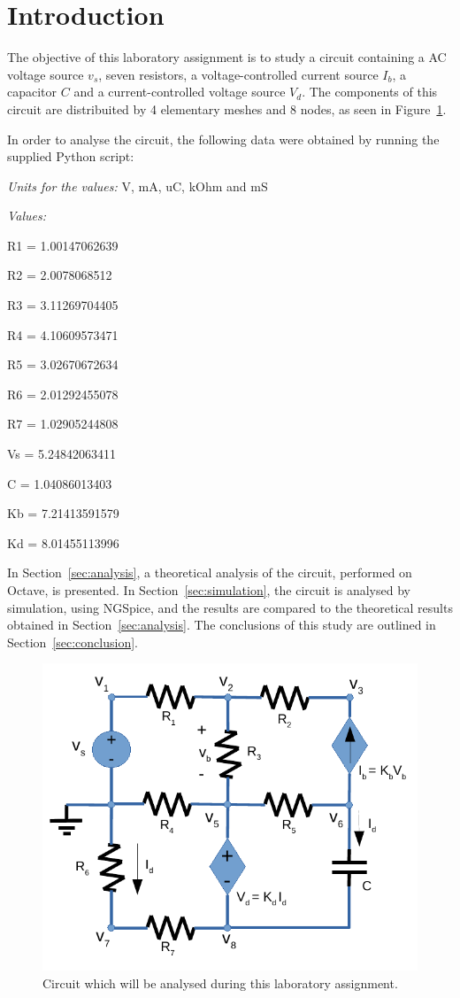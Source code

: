 \section{Introduction}
\label{sec:introduction}
The objective of this laboratory assignment is to study a circuit containing a
AC voltage source $v_s$, seven resistors, a voltage-controlled current source $I_b$, a capacitor $C$
and a current-controlled voltage source $V_d$. The components of this circuit are distribuited 
by 4 elementary meshes and 8 nodes, as seen in Figure~\ref{fig:circuit}. 

In order to analyse the circuit, the following data were obtained by running the supplied Python script: 

\textit{Units for the values:} V, mA, uC, kOhm and mS\par
\textit{Values:} 

R1 = 1.00147062639\par
R2 = 2.0078068512\par
R3 = 3.11269704405\par
R4 = 4.10609573471\par
R5 = 3.02670672634\par
R6 = 2.01292455078\par
R7 = 1.02905244808\par
Vs = 5.24842063411\par
C = 1.04086013403\par
Kb = 7.21413591579\par
Kd = 8.01455113996


In Section~\ref{sec:analysis}, a theoretical analysis of the circuit, 
performed on Octave, is presented. In Section~\ref{sec:simulation}, the 
circuit is analysed by simulation, using NGSpice, and the results are compared to 
the theoretical results obtained in Section~\ref{sec:analysis}. The conclusions 
of this study are outlined in Section~\ref{sec:conclusion}.

\begin{figure}[H] \centering
\includegraphics[width=0.4\linewidth]{circuit.pdf}
\caption{Circuit which will be analysed during this laboratory assignment.}
\label{fig:circuit}
\end{figure}

